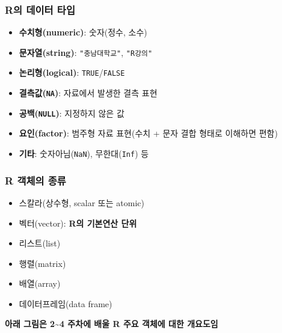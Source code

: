 \documentclass[
  11pt,
]{krantz}
\providecommand{\tightlist}{%
  \setlength{\itemsep}{0pt}\setlength{\parskip}{0pt}}
\begin{document}
\hypertarget{object-value}{%
\subsubsection*{R의 데이터 타입}\label{object-value}}


\begin{itemize}
\item
  \textbf{수치형(numeric)}: 숫자(정수, 소수)
\item
  \textbf{문자열(string)}: \texttt{"충남대학교"}, \texttt{"R강의"}
\item
  \textbf{논리형(logical)}: \texttt{TRUE}/\texttt{FALSE}
\item
  \textbf{결측값(\texttt{NA})}: 자료에서 발생한 결측 표현
\item
  \textbf{공백(\texttt{NULL})}: 지정하지 않은 값
\item
  \textbf{요인(factor)}: 범주형 자료 표현(수치 + 문자 결합 형태로 이해하면 편함)
\item
  \textbf{기타}: 숫자아님(\texttt{NaN}), 무한대(\texttt{Inf}) 등
\end{itemize}

\hypertarget{ch2-object-type}{%
\subsubsection*{R 객체의 종류}\label{ch2-object-type}}


\begin{itemize}
\tightlist
\item
  스칼라(상수형, scalar 또는 atomic)
\item
  벡터(vector): \textbf{R의 기본연산 단위}
\item
  리스트(list)
\item
  행렬(matrix)
\item
  배열(array)
\item
  데이터프레임(data frame)
\end{itemize}

\textbf{아래 그림은 2\textasciitilde4 주차에 배울 R 주요 객체에 대한 개요도임}

\footnotesize
\end{document}
